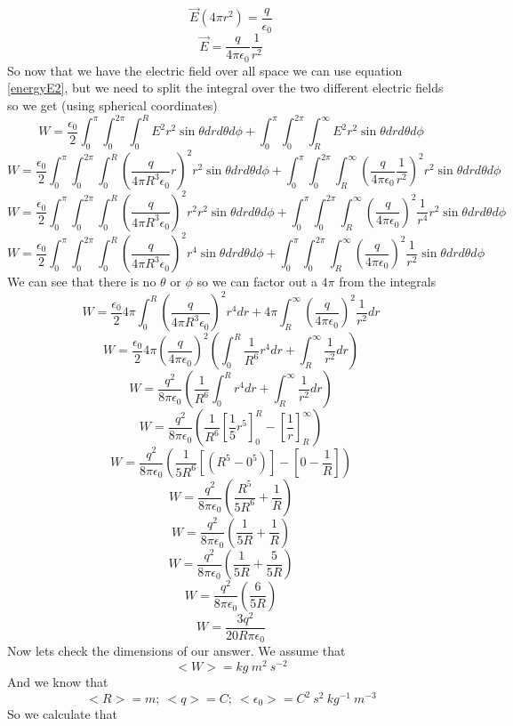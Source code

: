 \documentclass[11pt]{article}
\numberwithin{equation}{section}
\newcommand{\vecE}{\vec{E}}
\begin{document}
\begin{enumerate}[(a)]
\begin{enumerate}[(i)]
$$\vecE(4\pi r^2) = \frac{q}{\epsilon_0}$$
\begin{equation}
\vecE= \frac{q}{4\pi\epsilon_0}\frac{1}{r^2}
\label{Eout}
\end{equation}
So now that we have the electric field over all space we can use equation \ref{energyE2}, but we need to split the integral over the two different electric fields so we get (using spherical coordinates)
$$W=\frac{\epsilon_0}{2}\int_0^{\pi}\int_0^{2\pi}\int_0^{R}E^2r^2\sin{\theta}drd\theta d\phi +\int_0^{\pi}\int_0^{2\pi}\int_R^{\infty}E^2r^2\sin{\theta}drd\theta d\phi $$
$$W=\frac{\epsilon_0}{2}\int_0^{\pi}\int_0^{2\pi}\int_0^{R}\left(\frac{q}{4\pi R^3\epsilon_0}r\right)^2r^2\sin{\theta}drd\theta d\phi +\int_0^{\pi}\int_0^{2\pi}\int_R^{\infty}\left(\frac{q}{4\pi\epsilon_0}\frac{1}{r^2}\right)^2r^2\sin{\theta}drd\theta d\phi $$
$$W=\frac{\epsilon_0}{2}\int_0^{\pi}\int_0^{2\pi}\int_0^{R}\left(\frac{q}{4\pi R^3\epsilon_0}\right)^2r^2r^2\sin{\theta}drd\theta d\phi +\int_0^{\pi}\int_0^{2\pi}\int_R^{\infty}\left(\frac{q}{4\pi\epsilon_0}\right)^2\frac{1}{r^4}r^2\sin{\theta}drd\theta d\phi $$
$$W=\frac{\epsilon_0}{2}\int_0^{\pi}\int_0^{2\pi}\int_0^{R}\left(\frac{q}{4\pi R^3\epsilon_0}\right)^2r^4\sin{\theta}drd\theta d\phi +\int_0^{\pi}\int_0^{2\pi}\int_R^{\infty}\left(\frac{q}{4\pi\epsilon_0}\right)^2\frac{1}{r^2}\sin{\theta}drd\theta d\phi $$
We can see that there is no $\theta$ or $\phi$ so we can factor out a $4\pi$ from the integrals
$$W=\frac{\epsilon_0}{2}4\pi\int_0^{R}\left(\frac{q}{4\pi R^3\epsilon_0}\right)^2r^4dr +4\pi\int_R^{\infty}\left(\frac{q}{4\pi\epsilon_0}\right)^2\frac{1}{r^2}dr $$
$$W=\frac{\epsilon_0}{2}4\pi\left(\frac{q}{4\pi\epsilon_0}\right)^2\left(\int_0^{R}\frac{1}{R^6}r^4dr +\int_R^{\infty}\frac{1}{r^2}dr\right) $$
$$W=\frac{q^2}{8\pi\epsilon_0}\left(\frac{1}{R^6}\int_0^{R}r^4dr +\int_R^{\infty}\frac{1}{r^2}dr\right) $$
$$W=\frac{q^2}{8\pi\epsilon_0}\left(\frac{1}{R^6}\left[\frac{1}{5}r^5\right]_0^R-\left[\frac{1}{r}\right]_R^{\infty}\right) $$
$$W=\frac{q^2}{8\pi\epsilon_0}\left(\frac{1}{5R^6}\left[(R^5 - 0^5)\right]-\left[0 - \frac{1}{R}\right]\right) $$
$$W=\frac{q^2}{8\pi\epsilon_0}\left(\frac{R^5}{5R^6} + \frac{1}{R}\right) $$
$$W=\frac{q^2}{8\pi\epsilon_0}\left(\frac{1}{5R} + \frac{1}{R}\right) $$
$$W=\frac{q^2}{8\pi\epsilon_0}\left(\frac{1}{5R} + \frac{5}{5R}\right) $$
$$W=\frac{q^2}{8\pi\epsilon_0}\left(\frac{6}{5R}\right) $$
$$W=\frac{3q^2}{20 R\pi\epsilon_0}$$
Now lets check the dimensions of our answer. We assume that $$<W> = kg\ m^2\ s^{-2}$$
And we know that
$$<R>=m;\ <q>=C;\ <\epsilon_0> = C^2\ s^2\ kg^{-1}\ m^{-3}$$
So we calculate that


\end{enumerate}
\end{enumerate}
\end{document}
